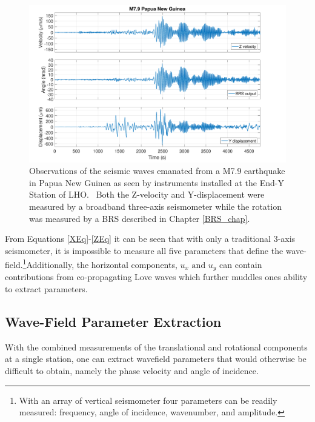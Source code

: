 \documentclass [12pt, proquest]{uwthesis}[2019]
\begin{document}
\begin{figure}[!h]
\begin{center}
\includegraphics[width=\textwidth]{PNGTimeSeries.pdf}
\caption[Observations of the seismic waves by instruments installed at the End-Y Station of LHO]{Observations of the seismic waves emanated from a M7.9 earthquake in Papua New Guinea as seen by instruments installed at the End-Y Station of LHO.~\cite{tiltSeismology} Both the Z-velocity and Y-displacement were measured by a broadband three-axis seismometer while the rotation was measured by a BRS described in Chapter \ref{BRS_chap}. }
\label{Earthquake}
\end{center}
\end{figure}

From Equations \ref{XEq}-\ref{ZEq} it can be seen that with only a traditional 3-axis seismometer, it is impossible to measure all five parameters that define the wave-field.\footnote{With an array of vertical seismometer four parameters can be readily measured: frequency, angle of incidence, wavenumber, and amplitude.}Additionally, the horizontal components, $u_x\text{ and }u_y$ can contain contributions from co-propagating Love waves which further muddles ones ability to extract parameters. 


\subsection{Wave-Field Parameter Extraction}

With the combined measurements of the translational and rotational components at a single station, one can extract wavefield parameters that would otherwise be difficult to obtain, namely the phase velocity and angle of incidence. 
\end{document}
